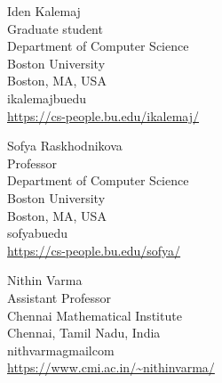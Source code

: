 \documentclass{toc}
\begin{document}
%
%
%


%
%
%
%
%
\begin{tocauthors}
\begin{tocinfo}[kalemaj]
 Iden Kalemaj\\
 Graduate student\\
 Department of Computer Science\\
 Boston University\\
 Boston, MA, USA\\
 ikalemaj\tocat{}bu\tocdot{}edu \\   %
 \url{https://cs-people.bu.edu/ikalemaj/}      %
\end{tocinfo}
\begin{tocinfo}[raskhodnikova]
  Sofya Raskhodnikova\\
  Professor\\
  Department of Computer Science\\
  Boston University\\
  Boston, MA, USA\\
  sofya\tocat{}bu\tocdot{}edu \\
  \url{https://cs-people.bu.edu/sofya/}
\end{tocinfo}
\begin{tocinfo}[varma]
  Nithin Varma\\
  Assistant Professor\\
  Chennai Mathematical Institute\\
  Chennai, Tamil Nadu, India\\
  nithvarma\tocat{}gmail\tocdot{}com \\
  \url{https://www.cmi.ac.in/~nithinvarma/}
\end{tocinfo}
\end{tocauthors}
\end{document}
